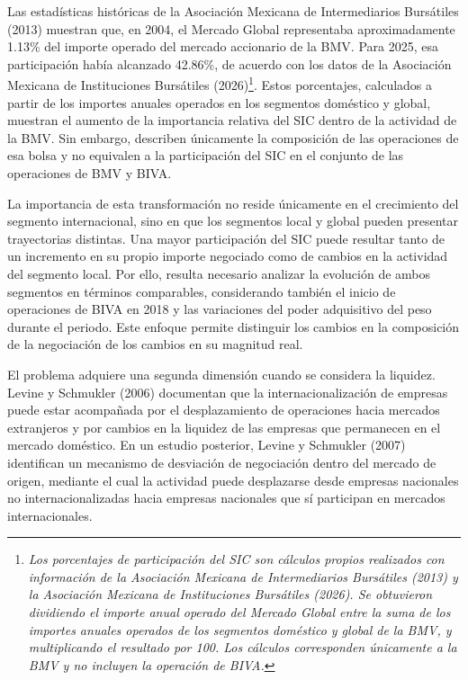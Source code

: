 Las estadísticas históricas de la Asociación Mexicana de Intermediarios Bursátiles (2013) muestran que, en 2004, el Mercado Global representaba aproximadamente 1.13\% del importe operado del mercado accionario de la BMV. Para 2025, esa participación había alcanzado 42.86\%, de acuerdo con los datos de la Asociación Mexicana de Instituciones Bursátiles (2026)\footnote{\emph{Los porcentajes de participación del SIC son cálculos propios realizados con información de la Asociación Mexicana de Intermediarios Bursátiles (2013) y la Asociación Mexicana de Instituciones Bursátiles (2026). Se obtuvieron dividiendo el importe anual operado del Mercado Global entre la suma de los importes anuales operados de los segmentos doméstico y global de la BMV, y multiplicando el resultado por 100. Los cálculos corresponden únicamente a la BMV y no incluyen la operación de BIVA.}}. Estos porcentajes, calculados a partir de los importes anuales operados en los segmentos doméstico y global, muestran el aumento de la importancia relativa del SIC dentro de la actividad de la BMV. Sin embargo, describen únicamente la composición de las operaciones de esa bolsa y no equivalen a la participación del SIC en el conjunto de las operaciones de BMV y BIVA.

La importancia de esta transformación no reside únicamente en el crecimiento del segmento internacional, sino en que los segmentos local y global pueden presentar trayectorias distintas. Una mayor participación del SIC puede resultar tanto de un incremento en su propio importe negociado como de cambios en la actividad del segmento local. Por ello, resulta necesario analizar la evolución de ambos segmentos en términos comparables, considerando también el inicio de operaciones de BIVA en 2018 y las variaciones del poder adquisitivo del peso durante el periodo. Este enfoque permite distinguir los cambios en la composición de la negociación de los cambios en su magnitud real.

El problema adquiere una segunda dimensión cuando se considera la liquidez. Levine y Schmukler (2006) documentan que la internacionalización de empresas puede estar acompañada por el desplazamiento de operaciones hacia mercados extranjeros y por cambios en la liquidez de las empresas que permanecen en el mercado doméstico. En un estudio posterior, Levine y Schmukler (2007) identifican un mecanismo de desviación de negociación dentro del mercado de origen, mediante el cual la actividad puede desplazarse desde empresas nacionales no internacionalizadas hacia empresas nacionales que sí participan en mercados internacionales.


